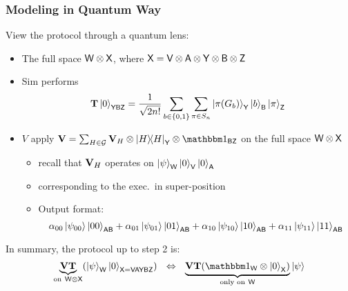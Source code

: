 \documentclass[aspectratio=1610, 12pt, xcolor={dvipsnames}]{beamer}
\begin{document}
\begin{frame}
\frametitle{Modeling in Quantum Way}
View the protocol through a quantum lens: 
\begin{itemize}
	\item
	The full space $\reg{w} \tensor \reg{x}$, where $\reg{x} = \reg{v} \tensor \reg{a} \tensor \reg{y} \tensor \reg{b} \tensor \reg{z}$
\item
Sim performs  $$\vb{T} \ket{0}_\reg{YBZ} = \frac{1}{\sqrt{2\SecPar!}} \sum_{b\in \bits} \sum_{\pi \in S_\SecPar} \ket{\pi(G_b)}_\reg{y} \ket{b}_\reg{B} \ket{\pi}_\reg{z}$$
\item
$V$ apply $\vb{V} = \sum_{H \in \mathcal{G}} \vb{V}_H \tensor \ketbra{H}_\reg{y} \tensor \idm_\reg{bz}$ on the full space $\reg{w}\tensor\reg{x}$
\begin{itemize}
	\item recall that $\vb{V}_H$ operates on $\ket{\psi}_\reg{w} \ket{0}_\reg{v} \ket{0}_\reg{a}$
\item 
corresponding to the exec.\ in super-position
\item
Output format:
$$ \alpha_{00}\ket{\psi_{00}}\ket{00}_\reg{ab} +  \alpha_{01}\ket{\psi_{01}}\ket{01}_\reg{ab} + \alpha_{10}\ket{\psi_{10}}\ket{10}_\reg{ab} +\alpha_{11}\ket{\psi_{11}}\ket{11}_\reg{ab}$$
\end{itemize}
\end{itemize}
In summary, the protocol up to step 2 is:
\begin{equation} \label{eq:half-Q}
\underbrace{\vb{V}\vb{T}}_{\text{on}~\reg{w}\tensor \reg{x}} (\ket{\psi}_\reg{w} \ket{0}_{\reg{x}= \reg{VAYBZ}}) ~~\Iff~~ \underbrace{\vb{V}\vb{T}(\idm_\reg{w} \tensor \ket{0}_\reg{x})}_{\text{only on}~\reg{w}} \ket{\psi}
\end{equation}
\end{frame}
\end{document}
